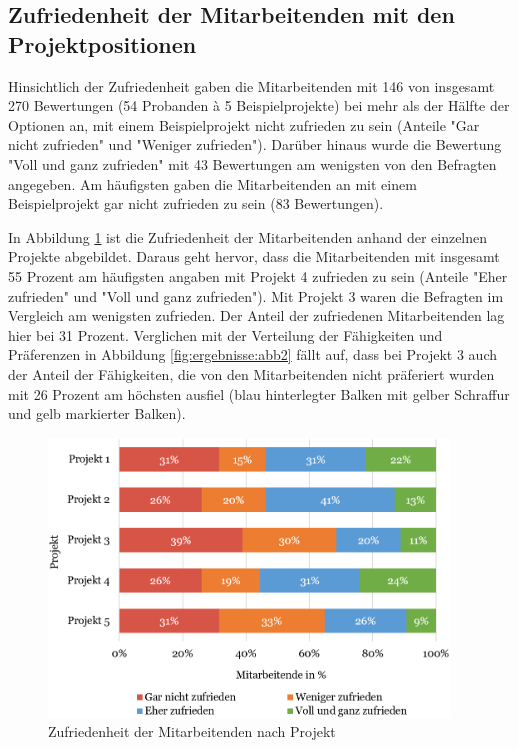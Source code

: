 \subsection{Zufriedenheit der Mitarbeitenden mit den Projektpositionen}
Hinsichtlich der Zufriedenheit gaben die Mitarbeitenden mit 146 von insgesamt 270 Bewertungen (54 Probanden \`{a} 5 Beispielprojekte) bei mehr als der Hälfte der Optionen an, mit einem Beispielprojekt nicht zufrieden zu sein (Anteile "Gar nicht zufrieden" und "Weniger zufrieden").
Darüber hinaus wurde die Bewertung "Voll und ganz zufrieden" mit 43 Bewertungen am wenigsten von den Befragten angegeben.
Am häufigsten gaben die Mitarbeitenden an mit einem Beispielprojekt gar nicht zufrieden zu sein (83 Bewertungen).

In Abbildung \ref{fig:ergebnisse:abb3} ist die Zufriedenheit der Mitarbeitenden anhand der einzelnen Projekte abgebildet.
Daraus geht hervor, dass die Mitarbeitenden mit insgesamt 55 Prozent am häufigsten angaben mit Projekt 4 zufrieden zu sein (Anteile "Eher zufrieden" und "Voll und ganz zufrieden").
Mit Projekt 3 waren die Befragten im Vergleich am wenigsten zufrieden.
Der Anteil der zufriedenen Mitarbeitenden lag hier bei 31 Prozent.
Verglichen mit der Verteilung der Fähigkeiten und Präferenzen in Abbildung \ref{fig:ergebnisse:abb2} fällt auf, dass bei Projekt 3 auch der Anteil der Fähigkeiten, die von den Mitarbeitenden nicht präferiert wurden mit 26 Prozent am höchsten ausfiel (blau hinterlegter Balken mit gelber Schraffur und gelb markierter Balken).

\begin{figure}[H]
    \centering
	\includegraphics[width=0.95\textwidth]{gfx/verteilung-z-nach-projekt.png}
	\caption[Zufriedenheit der Mitarbeitenden nach Projekt]{Zufriedenheit der Mitarbeitenden nach Projekt}
	\label{fig:ergebnisse:abb3}
\end{figure}

